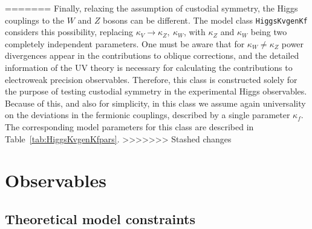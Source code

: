 \documentclass[preprint,3p,12pt]{elsarticle}
\begin{document}
{=======
Finally, relaxing the assumption of custodial symmetry, the Higgs couplings to the $W$ and $Z$ bosons can be different. The model class {\tt HiggsKvgenKf} considers this possibility, replacing $\kappa_V\rightarrow \kappa_Z,~\kappa_W$, with $\kappa_Z$ and $\kappa_W$ being two completely independent parameters. One must be aware that for $\kappa_W\not = \kappa_Z$ power divergences appear in the contributions to oblique corrections, and the detailed information of the UV theory is necessary for calculating the contributions to electroweak precision observables.
Therefore, this class is constructed solely for the purpose of testing custodial symmetry in the experimental Higgs observables. Because of this, and also for simplicity, in this class we assume again universality on the deviations in the fermionic couplings, described by a single parameter $\kappa_f$. The corresponding model parameters for this class are described in Table~\ref{tab:HiggsKvgenKfpars}.
>>>>>>> Stashed changes

\section{Observables}
\label{sec:Observables}

\subsection{Theoretical model constraints}
\label{sec:theoryconstraints}







}
\end{document}
